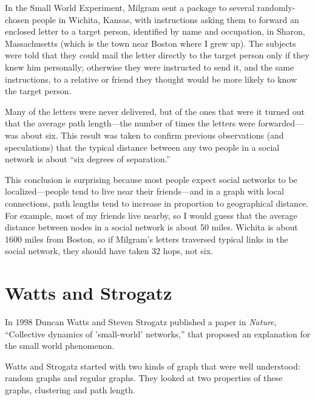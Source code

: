 \documentclass[10pt]{book}
\begin{document}
In the Small World Experiment, Milgram sent a package to several
randomly-chosen people in Wichita, Kansas, with instructions asking
them to forward an enclosed letter to a target person, identified by
name and occupation, in Sharon, Massachusetts (which is the town near
Boston where I grew up).  The subjects were told that they could mail
the letter directly to the target person only if they knew him
personally; otherwise they were instructed to send it, and the same
instructions, to a relative or friend they thought would be more
likely to know the target person.

Many of the letters were never delivered, but of the ones that
were it turned out that the average path length---the number of
times the letters were forwarded---was about six.  This result
was taken to confirm previous observations (and speculations) that
the typical distance between any two people in a social network
is about ``six degrees of separation.''

This conclusion is surprising because most people expect social
networks to be localized---people tend to live near their
friends---and in a graph with local connections, path lengths tend to
increase in proportion to geographical distance.  For example, most of
my friends live nearby, so I would guess that the average distance
between nodes in a social network is about 50 miles.  Wichita is about
1600 miles from Boston, so if Milgram's letters traversed typical
links in the social network, they should have taken 32 hops, not six.


\section{Watts and Strogatz}

In 1998 Duncan Watts and Steven Strogatz published a paper
in {\em Nature}, ``Collective dynamics of 'small-world' networks,''
that proposed an explanation for the small world phenomenon.

Watts and Strogatz started with two kinds of graph that were well
understood: random graphs and regular graphs.  They looked at two
properties of these graphs, clustering and path length.
\end{document}
